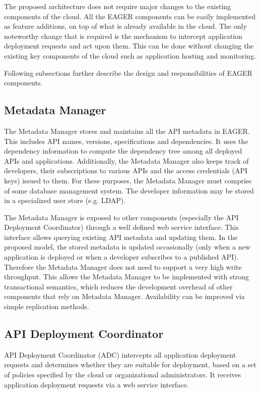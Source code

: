 The proposed architecture does not require major changes to the existing components of the cloud. All the 
EAGER components can be easily implemented as feature additions, on top of what is already available 
in the cloud. The only noteworthy change that is required is the mechanism to intercept application deployment requests and act upon them. 
This can be done without changing the existing key components of the cloud such as application hosting and monitoring.

Following subsections further describe the design and responsibilities of EAGER components.

\subsection{Metadata Manager}
The Metadata Manager stores and maintains all the API metadata in EAGER. This includes API names, versions, specifications and dependencies.
It uses the dependency information to compute the dependency tree among all deployed APIs and applications. Additionally, the Metadata Manager
also keeps track of developers, their subscriptions to various APIs and the access credentials (API keys) issued to them. For these purposes,
the Metadata Manager must comprise of some database management system. The developer information may be stored in a specialized user
store (e.g. LDAP).

The Metadata Manager is exposed to other components (especially the API Deployment Coordinator) through a well defined web service interface.
This interface allows querying existing API metadata and updating them. In the proposed model, the stored metadata is updated 
occasionally (only when a new application is deployed or when a developer subscribes to a published API). Therefore the Metadata Manager
does not need to support a very high write throughput. This allows the Metadata Manager to be implemented with strong transactional semantics,
which reduces the development overhead of other components that rely on Metadata Manager. Availability can be improved via
simple replication methods.

\subsection{API Deployment Coordinator}
API Deployment Coordinator (ADC) intercepts all application deployment requests and determines whether they are suitable for deployment, based
on a set of policies specified by the cloud or organizational administrators. It receives application deployment requests via a web service interface.

